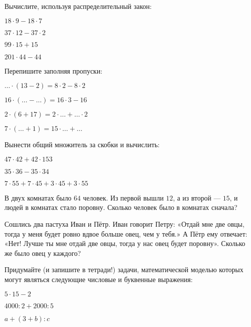 \begin{listofex}
	\item Вычислите, используя распределительный закон:
	\begin{enumcols}[itemcolumns=2]
		\item \( 18\cdot9-18\cdot7 \)
		\item \( 37\cdot12-37\cdot2 \)
		\item \( 99\cdot15+15 \)
		\item \( 201\cdot44-44 \)
	\end{enumcols}
	\item Перепишите заполняя пропуски:
	\begin{enumcols}[itemcolumns=2]
		\item \( {\dots}\cdot(13-2)=8\cdot2-8\cdot2 \)
		\item \( 16\cdot({\dots}-\dots)=16\cdot3-16 \)
		\item \( 2\cdot(6+17)=2\cdot{\dots}+{\dots}\cdot2 \)
		\item \( 7\cdot({\dots}+1)=15\cdot{\dots}+{\dots} \)
	\end{enumcols}
	\item Вынести общий множитель за скобки и вычислить:
	\begin{enumcols}[itemcolumns=3]
		\item \( 47\cdot42+42\cdot153 \)
		\item \( 35\cdot36-35\cdot34 \)
		\item \( 7\cdot55+7\cdot45+3\cdot45+3\cdot55 \)
	\end{enumcols}
	\item В двух комнатах было \( 64 \) человек. Из первой вышли \( 12 \), а из второй --- \( 15 \), и людей в комнатах стало поровну. Сколько человек было в комнатах сначала?
	\item Сошлись два пастуха Иван и Пётр. Иван говорит Петру: «Отдай мне две овцы,
	тогда у меня будет ровно вдвое больше овец, чем у тебя.» А Пётр ему отвечает: «Нет!
	Лучше ты мне отдай две овцы, тогда у нас овец будет поровну». Сколько же было овец у
	каждого?
	\item Придумайте (и запишите в тетради!) задачи, математической моделью которых могут
	являться следующие числовые и буквенные выражения:
	\begin{enumcols}[itemcolumns=3]
		\item \( 5\cdot15-2 \)
		\item \( 4000:2+2000:5 \)
		\item \( a+(3+b):c \)
	\end{enumcols}

\end{listofex}
